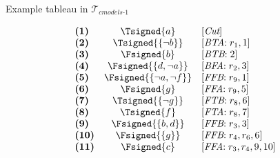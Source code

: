 \begin{frame}{Example tableau in $\mathcal{T}_{\textit{cmodels{-}1}}$}
\TableauExampleProgram
\begin{center}
\begin{minipage}[t]{16cm}
\tiny
\begin{minipage}[t]{4.5cm}
\[
\hspace{-0.3cm}
\begin{array}{lcl}
\textbf{(1)}                                       &
  \Tsigned{a}                                      &
  [\textit{Cut}]                                   \\
\textbf{(2)}                                       &
  \Tsigned{\{\neg b\}}                     &
  [\textit{BTA}{:}\; r_1, \text{1}]                \\
\textbf{(3)}                                       &
  \Fsigned{b}                                      &
  [\textit{BTB}{:}\; \text{2}]                     \\
\textbf{(4)}                                       &
  \Fsigned{\{d,\neg a\}}                   &
  [\textit{BFA}{:}\;r_2, \text{3}]                 \\
\textbf{(5)}                                       &
  \Fsigned{\{\neg a,\neg f\}}      &
  [\textit{FFB}{:}\;r_9, \text{1}]                 \\
\textbf{(6)}                                       &
  \Fsigned{g}                                      &
  [\textit{FFA}{:}\;r_9, \text{5}]                 \\
\textbf{(7)}                                       &
  \Tsigned{\{\neg g\}}                     &
  [\textit{FTB}{:}\;r_8, \text{6}]                 \\
\textbf{(8)}                                       &
  \Tsigned{f}                                      &
  [\textit{FTA}{:}\;r_8, \text{7}]                 \\
\textbf{(9)}                                       &
  \Fsigned{\{b,d\}}                                &
  [\textit{FFB}{:}\;r_3, \text{3}]                 \\
\textbf{(10)}                                      &
  \Fsigned{\{g\}}                                  &
  [\textit{FFB}{:}\;r_4, r_6, \text{6}]            \\
\textbf{(11)}                                      &
  \Fsigned{c}                                      &
  [\textit{FFA}{:}\;r_3,r_4, \text{9}, \text{10}]  \\

\end{array}\]
\end{minipage}
\end{minipage}
\end{center}
\end{frame}
